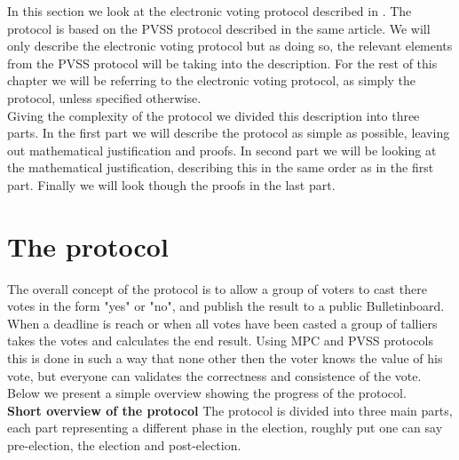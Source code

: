 In this section we look at the electronic voting protocol described in \cite{Schoenmakers1999}. The protocol is based on the PVSS protocol described in the same article. We will only describe the electronic voting protocol but as doing so, the relevant elements from the PVSS protocol will be taking into the description. For the rest of this chapter we will be referring to the electronic voting protocol, as simply the protocol, unless specified otherwise. \\

\noindent
Giving the complexity of the protocol we divided this description into three parts. In the first part we will describe the protocol as simple as possible, leaving out mathematical justification and proofs. In second part we will be looking at the mathematical justification, describing this in the same order as in the first part. Finally we will look though the proofs in the last part. 


\section{The protocol}

\noindent
The overall concept of the protocol is to allow a group of voters to cast there votes in the form "yes" or "no", and publish the result to a public Bulletinboard. When a deadline is reach or when all votes have been casted a group of talliers takes the votes and calculates the end result. 
Using MPC and PVSS protocols this is done in such a way that none other then the voter knows the value of his vote, but everyone can validates the correctness and consistence of the vote. Below we present a simple overview showing the progress of the protocol. \\

\noindent
\textbf{Short overview of the protocol}
The protocol is divided into three main parts, each part representing a different phase in the election, roughly put one can say pre-election, the election and post-election. 


